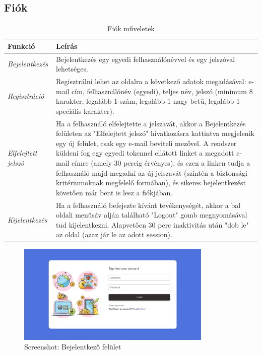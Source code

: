 \subsection{Fiók}
\begin{table}[H]
	\centering
	\begin{tabular}{ | m{} | m{} | }
		\hline
		\textbf{Funkció} & \textbf{Leírás} \\
		\hline \hline
		\emph{Bejelentkezés} & Bejelentkezés egy egyedi felhasználónévvel és egy jelszóval lehetséges. \\
		\hline
		\emph{Regisztráció} &  Regisztrálni lehet az oldalra a következő adatok megadásával: e-mail cím, felhasználónév (egyedi), teljes név, jelszó (minimum 8 karakter, legalább 1 szám, legalább 1 nagy betű, legalább 1 speciális karakter).  \\
		\hline
		\emph{Elfelejtett jelszó} & Ha a felhasználó elfelejtette a jelszavát, akkor a Bejelentkezés felületen az "Elfelejtett jelszó" hivatkozásra kattintva megjelenik egy új felület, csak egy e-mail beviteli mezővel. A rendszer küldeni fog egy egyedi tokennel ellátott linket a megadott e-mail címre (amely 30 percig érvényes), és ezen a linken tudja a felhasználó majd megadni az új jelszavát (szintén a biztonsági kritériumoknak megfelelő formában), és sikeres bejelentkezést követően már bent is lesz a fiókjában. \\
		\hline
		\emph{Kijelentkezés} & Ha a felhasználó befejezte kívánt tevékenységét, akkor a bal oldali menüsáv alján található "Logout" gomb megnyomásával tud kijelentkezni. Alapvetően 30 perc inaktivitás után "dob le" az oldal (azaz jár le az adott session). \\
		\hline
	\end{tabular}
	\caption{Fiók műveletek}
	\label{tab:example-1}
\end{table}

\begin{figure}[H]
	\centering
	\includegraphics[height=180px]{img/login-screenshot}
	\caption{Screenshot: Bejelentkező felület}
	\label{fig:example-1}
\end{figure}

